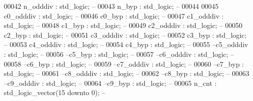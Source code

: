 \begin{DoxyCode}
00042       \textcolor{vhdlchar}{n_odddiv}          \textcolor{vhdlchar}{:} \textcolor{comment}{std\_logic};\textcolor{keyword}{ --}
00043       \textcolor{vhdlchar}{n_byp}             \textcolor{vhdlchar}{:} \textcolor{comment}{std\_logic};\textcolor{keyword}{ --}
00044       
00045       \textcolor{vhdlchar}{c0_odddiv}         \textcolor{vhdlchar}{:} \textcolor{comment}{std\_logic};\textcolor{keyword}{ --}
00046       \textcolor{vhdlchar}{c0_byp}            \textcolor{vhdlchar}{:} \textcolor{comment}{std\_logic};\textcolor{keyword}{ --}
00047       \textcolor{vhdlchar}{c1_odddiv}         \textcolor{vhdlchar}{:} \textcolor{comment}{std\_logic};\textcolor{keyword}{ --}
00048       \textcolor{vhdlchar}{c1_byp}            \textcolor{vhdlchar}{:} \textcolor{comment}{std\_logic};\textcolor{keyword}{ --}
00049       \textcolor{vhdlchar}{c2_odddiv}         \textcolor{vhdlchar}{:} \textcolor{comment}{std\_logic};\textcolor{keyword}{ --}
00050       \textcolor{vhdlchar}{c2_byp}            \textcolor{vhdlchar}{:} \textcolor{comment}{std\_logic};\textcolor{keyword}{ --}
00051       \textcolor{vhdlchar}{c3_odddiv}         \textcolor{vhdlchar}{:} \textcolor{comment}{std\_logic};\textcolor{keyword}{ --}
00052       \textcolor{vhdlchar}{c3_byp}            \textcolor{vhdlchar}{:} \textcolor{comment}{std\_logic};\textcolor{keyword}{ --}
00053       \textcolor{vhdlchar}{c4_odddiv}         \textcolor{vhdlchar}{:} \textcolor{comment}{std\_logic};\textcolor{keyword}{ --}
00054       \textcolor{vhdlchar}{c4_byp}            \textcolor{vhdlchar}{:} \textcolor{comment}{std\_logic};\textcolor{keyword}{ --}
00055 \textcolor{keyword}{      --c5\_odddiv       : std\_logic; --}
00056 \textcolor{keyword}{      --c5\_byp          : std\_logic; --}
00057 \textcolor{keyword}{      --c6\_odddiv       : std\_logic; --}
00058 \textcolor{keyword}{      --c6\_byp          : std\_logic; --}
00059 \textcolor{keyword}{      --c7\_odddiv       : std\_logic; --}
00060 \textcolor{keyword}{      --c7\_byp          : std\_logic; --}
00061 \textcolor{keyword}{      --c8\_odddiv       : std\_logic; --}
00062 \textcolor{keyword}{      --c8\_byp          : std\_logic; --}
00063 \textcolor{keyword}{      --c9\_odddiv       : std\_logic; --}
00064 \textcolor{keyword}{      --c9\_byp          : std\_logic; --}
00065       \textcolor{vhdlchar}{n_cnt}             \textcolor{vhdlchar}{:} \textcolor{comment}{std\_logic\_vector}\textcolor{vhdlchar}{(}\textcolor{vhdllogic}{}\textcolor{vhdllogic}{15} \textcolor{keywordflow}{downto} \textcolor{vhdllogic}{}\textcolor{vhdllogic}{0}\textcolor{vhdlchar}{)};\textcolor{keyword}{ -- }

\end{DoxyCode}
